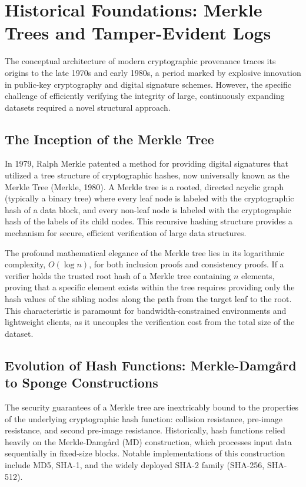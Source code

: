 \section{Historical Foundations: Merkle Trees and Tamper-Evident Logs}
\label{sec:historical_merkle}

The conceptual architecture of modern cryptographic provenance traces its origins to the late 1970s and early 1980s, a period marked by explosive innovation in public-key cryptography and digital signature schemes. However, the specific challenge of efficiently verifying the integrity of large, continuously expanding datasets required a novel structural approach.

\subsection{The Inception of the Merkle Tree}
In 1979, Ralph Merkle patented a method for providing digital signatures that utilized a tree structure of cryptographic hashes, now universally known as the Merkle Tree (Merkle, 1980). A Merkle tree is a rooted, directed acyclic graph (typically a binary tree) where every leaf node is labeled with the cryptographic hash of a data block, and every non-leaf node is labeled with the cryptographic hash of the labels of its child nodes. This recursive hashing structure provides a mechanism for secure, efficient verification of large data structures.

The profound mathematical elegance of the Merkle tree lies in its logarithmic complexity, $O(\log n)$, for both inclusion proofs and consistency proofs. If a verifier holds the trusted root hash of a Merkle tree containing $n$ elements, proving that a specific element exists within the tree requires providing only the hash values of the sibling nodes along the path from the target leaf to the root. This characteristic is paramount for bandwidth-constrained environments and lightweight clients, as it uncouples the verification cost from the total size of the dataset.

\subsection{Evolution of Hash Functions: Merkle-Damgård to Sponge Constructions}
The security guarantees of a Merkle tree are inextricably bound to the properties of the underlying cryptographic hash function: collision resistance, pre-image resistance, and second pre-image resistance. Historically, hash functions relied heavily on the Merkle-Damgård (MD) construction, which processes input data sequentially in fixed-size blocks. Notable implementations of this construction include MD5, SHA-1, and the widely deployed SHA-2 family (SHA-256, SHA-512). 


